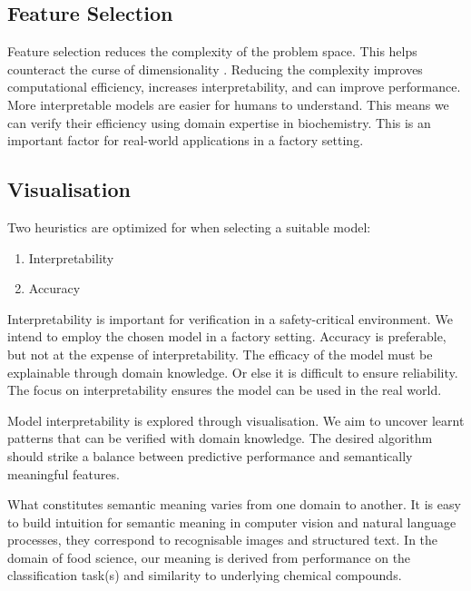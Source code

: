 \documentclass[runningheads]{llncs}
\begin{document}
\subsection{Feature Selection}
\label{sec:background-feature-selection}

Feature selection reduces the complexity of the problem space.
This helps counteract the curse of dimensionality \cite{koppen2000curse}.
Reducing the complexity improves computational efficiency, increases interpretability, and can improve performance.
More interpretable models are easier for humans to understand.
This means we can verify their efficiency using domain expertise in biochemistry.
This is an important factor for real-world applications in a factory setting.

\subsection{Visualisation}
\label{sec:background-visualisation}

Two heuristics are optimized for when selecting a suitable model:

\begin{enumerate}
  \item Interpretability
  \item Accuracy
\end{enumerate}

Interpretability is important for verification in a safety-critical environment.
We intend to employ the chosen model in a factory setting.
Accuracy is preferable, but not at the expense of interpretability.
The efficacy of the model must be explainable through domain knowledge.
Or else it is difficult to ensure reliability.
The focus on interpretability ensures the model can be used in the real world.

Model interpretability is explored through visualisation.
We aim to uncover learnt patterns that can be verified with domain knowledge.
The desired algorithm should strike a balance between predictive performance and semantically meaningful features.

What constitutes semantic meaning varies from one domain to another.
It is easy to build intuition for semantic meaning in computer vision and natural language processes, they correspond to recognisable images and structured text.
In the domain of food science, our meaning is derived from performance on the classification task(s) and similarity to underlying chemical compounds.
\end{document}

